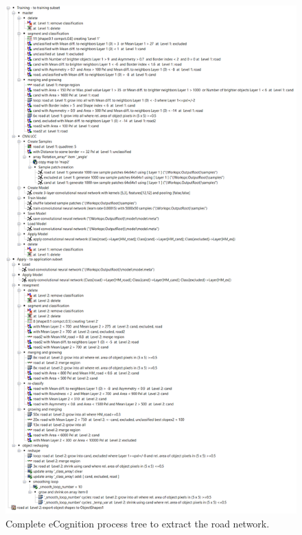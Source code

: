 \documentclass[remotesensing,article,accept,pdftex,moreauthors]{Definitions/mdpi}
\begin{document}
\begin{figure}[H]
\includegraphics[width=12 cm]{appendix.png}
\caption{Complete eCognition process tree to extract the road network. \label{figA}}
\end{figure}   
\newpage
\end{document}
